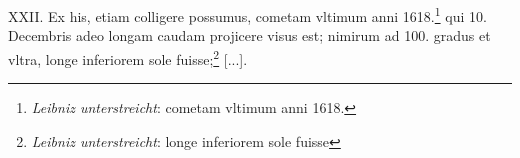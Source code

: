 \pend \pstart [p.~187] XXII. Ex his, etiam colligere possumus, cometam\protect{}  vltimum anni 1618.\footnote{\textit{Leibniz unterstreicht}: cometam vltimum anni 1618.} qui 10. Decembris adeo longam caudam\protect{} projicere visus est; nimirum ad 100. gradus et  vltra, longe inferiorem sole fuisse;\footnote{\textit{Leibniz unterstreicht}: longe inferiorem sole fuisse} [...].